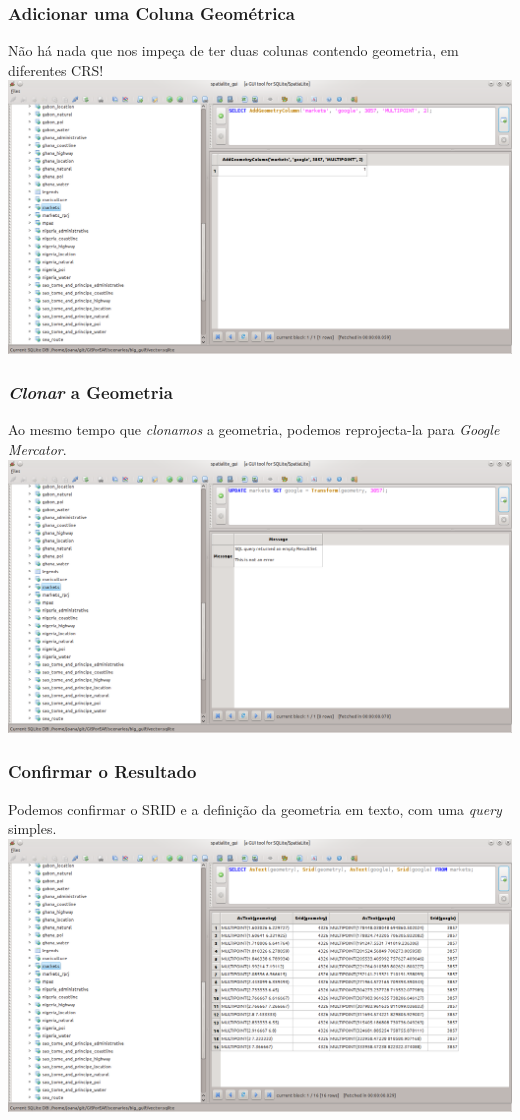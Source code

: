 \documentclass[hyperref={pdfpagelabels=true}]{beamer}
\begin{document}
\begin{frame}
\frametitle{Adicionar uma Coluna Geom\'{e}trica}
N\~{a}o h\'{a} nada que nos impe\c{c}a de ter duas colunas contendo geometria, em diferentes CRS!\\
\includegraphics[scale=0.25]{distance5.png}
\end{frame}

\begin{frame}
\frametitle{\textit{Clonar} a Geometria}
Ao mesmo tempo que \textit{clonamos} a geometria, podemos reprojecta-la para \textit{Google Mercator}.\\
\includegraphics[scale=0.25]{distance6.png}
\end{frame}

\begin{frame}
\frametitle{Confirmar o Resultado}
Podemos confirmar o SRID e a defini\c{c}\~{a}o da geometria em texto, com uma \textit{query} simples.\\
\includegraphics[scale=0.25]{distance7.png}
\end{frame}
\end{document}
